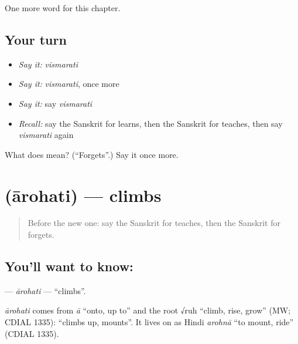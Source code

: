 \begin{grammarlens}[title={What you've built}]
One more word for this chapter.
\end{grammarlens}

\subsection*{Your turn}
\begin{itemize}
\raggedright
  \item \emph{Say it:} \emph{vismarati}
  \item \emph{Say it:} \emph{vismarati}, once more
  \item \emph{Say it:} say \emph{vismarati}
  \item \emph{Recall:} say the Sanskrit for learns, then the Sanskrit for teaches, then say \emph{vismarati} again
\end{itemize}

\begin{tcolorbox}[breakable,colback=teal!4,colframe=teal!35!black,title={Before you move on}]
What does  mean? (\textquotedblleft{}Forgets\textquotedblright{}.) Say it once more.
\end{tcolorbox}
\section[\texorpdfstring{\sk{आरोहति} (ārohati)}{आरोहति (ārohati)}]{ (ārohati) — climbs}

\label{lesson:SA-C135-arohati}



\begin{quote}
Before the new one: say the Sanskrit for teaches, then the Sanskrit for forgets.
\end{quote}

\subsection*{You'll want to know: }
\textbf{} — \emph{ārohati} — \textquotedblleft{}climbs\textquotedblright{}.

\begin{cousinweb}
\emph{ārohati} comes from \emph{ā} \textquotedblleft{}onto, up to\textquotedblright{} and the root √ruh \textquotedblleft{}climb, rise, grow\textquotedblright{} (MW; CDIAL 1335): \textquotedblleft{}climbs up, mounts\textquotedblright{}. It lives on as Hindi \emph{arohnā} \textquotedblleft{}to mount, ride\textquotedblright{} (CDIAL 1335).
\end{cousinweb}


